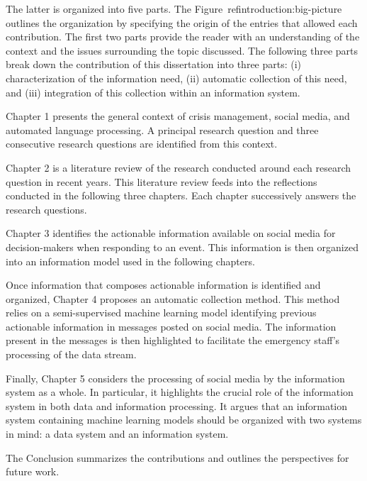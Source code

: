 The latter is organized into five parts.
The Figure~ref{introduction:big-picture} outlines the organization by specifying the origin of the entries that allowed each contribution.
The first two parts provide the reader with an understanding of the context and the issues surrounding the topic discussed.
The following three parts break down the contribution of this dissertation into three parts: (i) characterization of the information need, (ii) automatic collection of this need, and (iii) integration of this collection within an information system.

Chapter 1 presents the general context of crisis management, social media, and automated language processing.
A principal research question and three consecutive research questions are identified from this context.

Chapter 2 is a literature review of the research conducted around each research question in recent years.
This literature review feeds into the reflections conducted in the following three chapters.
Each chapter successively answers the research questions.

Chapter 3 identifies the actionable information available on social media for decision-makers when responding to an event.
This information is then organized into an information model used in the following chapters.

Once information that composes actionable information is identified and organized, Chapter 4 proposes an automatic collection method.
This method relies on a semi-supervised machine learning model identifying previous actionable information in messages posted on social media.
The information present in the messages is then highlighted to facilitate the emergency staff's processing of the data stream.

Finally, Chapter 5 considers the processing of social media by the information system as a whole.
In particular, it highlights the crucial role of the information system in both data and information processing.
It argues that an information system containing machine learning models should be organized with two systems in mind: a data system and an information system.

The Conclusion summarizes the contributions and outlines the perspectives for future work.

